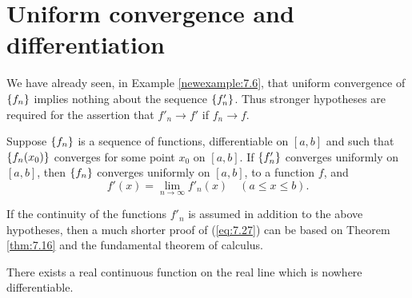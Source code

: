\section{Uniform convergence and differentiation}

We have already seen, in Example \ref{newexample:7.6}, 
that uniform convergence of $\protect\{f_n\}$ implies
nothing about the sequence $\protect\{f'_n\}$. 
Thus stronger hypotheses are required for the assertion that 
$f'_n \rightarrow f'$ if $f_n \rightarrow f$.

\begin{thm}
    \label{thm:7.17}
    Suppose $\protect\{f_n\}$ is a sequence of functions, differentiable on $[a, b]$
    and such that $\protect\{f_n(x_0)\}$ converges for some point $x_0$ on $[a, b]$. 
    If $\protect\{f'_n\}$ converges uniformly on $[a, b ]$, 
    then $\protect\{f_n\}$ converges uniformly on $[a, b ]$, 
    to a function $f$, and
    \begin{equation}
        \label{eq:7.27}
        f'(x) = \lim_{n \to \infty} f'_n (x)
        \quad 
        (a \leq x \leq b).
    \end{equation}
\end{thm}


\begin{myremark*}
    If the continuity of the functions $f'_n$ is assumed in addition to
    the above hypotheses, 
    then a much shorter proof of (\ref{eq:7.27}) can be based on
    Theorem \ref{thm:7.16} and the fundamental theorem of calculus.
\end{myremark*}

\begin{thm}
    There exists a real continuous function on the real line which is
    nowhere differentiable.
\end{thm}

